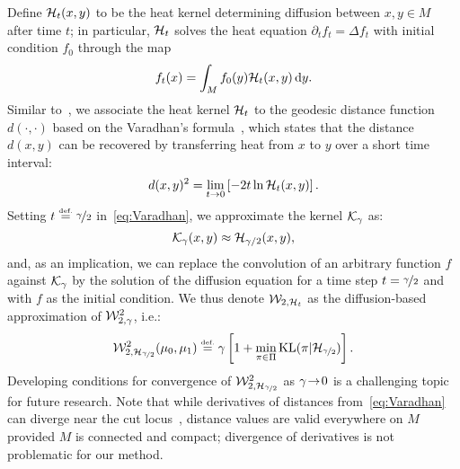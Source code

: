 Define $\mathcal H_t(x,y)$ to be the heat kernel determining diffusion between $x,y\in M$ after time $t$; in particular, $\mathcal H_t$ solves the heat equation $\partial_t f_t=\Delta f_t$ with initial condition $f_0$ through the map%
\[
f_t(x) = \int_M f_0(y)\mathcal H_t(x,y)\, \mathrm{d} y.
\]  
Similar to~\cite{crane-2013}, we associate the heat kernel $\mathcal H_t$ to the geodesic distance function $d(\cdot,\cdot)$ based on the Varadhan's formula~, which states that the distance $d(x,y)$ can be recovered by transferring heat from $x$ to $y$ over a short time interval:
\begin{equation}
\label{eq:Varadhan}
d(x,y)^2 = \lim_{t \to 0} \left[ -2t\ln\mathcal H_t(x,y)\right].
\end{equation}
Setting $t\eqdef\nicefrac{\gamma}{2}$ in~\eqref{eq:Varadhan}, we approximate the kernel $\mathcal K_\gamma$ as:
$$\mathcal K_{\gamma}(x,y) \approx \mathcal H_{\gamma/2}(x,y),$$
and, as an implication, we can replace the convolution of an arbitrary function $f$ against $\mathcal K_{\gamma}$ by the solution of the diffusion equation for a time step $t=\nicefrac{\gamma}{2}$ and with $f$ as the initial condition.
We thus denote $\mathcal W_{2,\mathcal H_t}$ as the diffusion-based approximation of $\mathcal W_{2,\gamma}^2$, i.e.:
\begin{equation}
\label{eq:convDist}
\W_{2,\H_{\nicefrac\ga2}}^2(\mu_0,\mu_1) \eqdef \gamma\left[1+\min_{\pi\in\Pi} \KL(\pi|\H_{\nicefrac\ga2})\right].
\end{equation}
Developing conditions for convergence of $\mathcal W_{2,\mathcal H_{\nicefrac{\gamma}2}}^2$ as $\gamma\!\rightarrow\!0$ is a challenging topic for future research.  Note that while derivatives of distances from~\eqref{eq:Varadhan} can diverge near the cut locus~\cite{malliavin-1996}, distance values are valid everywhere on $M$ provided $M$ is connected and compact; divergence of derivatives is not problematic for our method.

